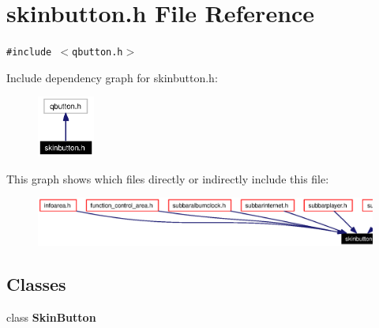 \section{skinbutton.h File Reference}
\label{skinbutton_8h}


{\tt \#include $<$qbutton.h$>$}\par


Include dependency graph for skinbutton.h:\begin{figure}[H]
\begin{center}
\leavevmode
\includegraphics[width=53pt]{skinbutton_8h__incl}
\end{center}
\end{figure}


This graph shows which files directly or indirectly include this file:\begin{figure}[H]
\begin{center}
\leavevmode
\includegraphics[width=420pt]{skinbutton_8h__dep__incl}
\end{center}
\end{figure}
\subsection*{Classes}
\begin{CompactItemize}
\item 
class {\bf Skin\-Button}
\end{CompactItemize}
